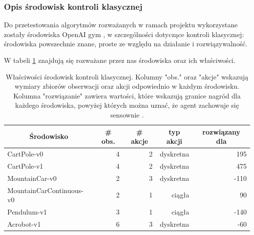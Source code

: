 \documentclass[12pt,a4paper]{article}
\begin{document}
\subsubsection{Opis środowisk kontroli klasycznej}

Do przetestowania algorytmów rozważanych w ramach projektu wykorzystane
zostały środowiska OpenAI gym \cite{openai_gym}, w szczególności dotyczące
kontroli klasycznej: środowiska powszechnie znane, proste ze względu
na działanie i rozwiązywalność.

W tabeli \ref{table:env_properties} znajdują się rozważane przez nas
środowiska oraz ich właściwości.


\begin{table}[!h]
  \begin{tabular}{lrrrr}
    \hline
    \multicolumn{1}{c}{Środowisko} & \multicolumn{1}{c}{\# obs.} & \multicolumn{1}{c}{\# akcje} & \multicolumn{1}{c}{typ akcji} & \multicolumn{1}{c}{rozwiązany dla} \\
    \hline
    CartPole-v0                    & 4                           & 2                            & dyskretna                     & 195                                \\
    CartPole-v1                    & 4                           & 2                            & dyskretna                     & 475                                \\
    MountainCar-v0                 & 2                           & 3                            & dyskretna                     & -110                               \\
    MountainCarContinuous-v0       & 2                           & 1                            & ciągła                        & 90                                 \\
    Pendulum-v1                    & 3                           & 1                            & ciągła                        & -140                               \\
    Acrobot-v1                     & 6                           & 3                            & dyskretna                     & -60                                \\
    \hline
  \end{tabular}
  \caption{
    Właściwości środowisk kontroli klasycznej. Kolumny "obs." oraz "akcje"
    wskazują wymiary zbiorów obserwacji oraz akcji odpowiednio w każdym środowisku.
    Kolumna "rozwiązanie" zawiera wartości, które wskazują granice
    nagród dla każdego środowiska, powyżej których można uznać, że agent
    zachowuje się sensownie \cite{analyzing_reinforcement} \cite{openai_gym}.
  }\label{table:env_properties}
\end{table}
\end{document}
